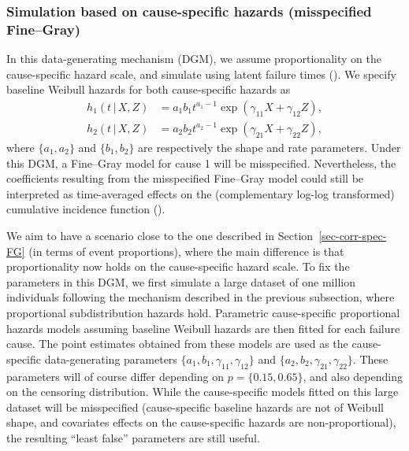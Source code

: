\documentclass[
  letterpaper,
  DIV=11,
  numbers=noendperiod]{scrreprt}
\newcommand{\given}{\,|\,}
\begin{document}
\subsubsection{Simulation based on cause-specific hazards (misspecified
Fine--Gray)}\label{simulation-based-on-cause-specific-hazards-misspecified-finegray}

In this data-generating mechanism (DGM), we assume proportionality on
the cause-specific hazard scale, and simulate using latent failure times
(). We specify baseline Weibull hazards for both
cause-specific hazards as \begin{align*}
    h_1(t \given X, Z) &= a_1b_1t^{a_1 - 1}\exp(\gamma_{11}X + \gamma_{12}Z), \\
    h_2(t \given X, Z) &= a_2b_2t^{a_2 - 1}\exp(\gamma_{21}X + \gamma_{22}Z),
\end{align*} where \(\{a_1,a_2\}\) and \(\{b_1,b_2\}\) are respectively
the shape and rate parameters. Under this DGM, a Fine--Gray model for
cause 1 will be misspecified. Nevertheless, the coefficients resulting
from the misspecified Fine--Gray model could still be interpreted as
time-averaged effects on the (complementary log-log transformed)
cumulative incidence function
().

We aim to have a scenario close to the one described in
Section~\ref{sec-corr-spec-FG} (in terms of event proportions), where
the main difference is that proportionality now holds on the
cause-specific hazard scale. To fix the parameters in this DGM, we first
simulate a large dataset of one million individuals following the
mechanism described in the previous subsection, where proportional
subdistribution hazards hold. Parametric cause-specific proportional
hazards models assuming baseline Weibull hazards are then fitted for
each failure cause. The point estimates obtained from these models are
used as the cause-specific data-generating parameters
\(\{a_1,b_1, \gamma_{11}, \gamma_{12}\}\) and
\(\{a_2,b_2, \gamma_{21}, \gamma_{22}\}\). These parameters will of
course differ depending on \(p = \{0.15, 0.65\}\), and also depending on
the censoring distribution. While the cause-specific models fitted on
this large dataset will be misspecified (cause-specific baseline hazards
are not of Weibull shape, and covariates effects on the cause-specific
hazards are non-proportional), the resulting ``least false'' parameters
are still useful.
\end{document}
